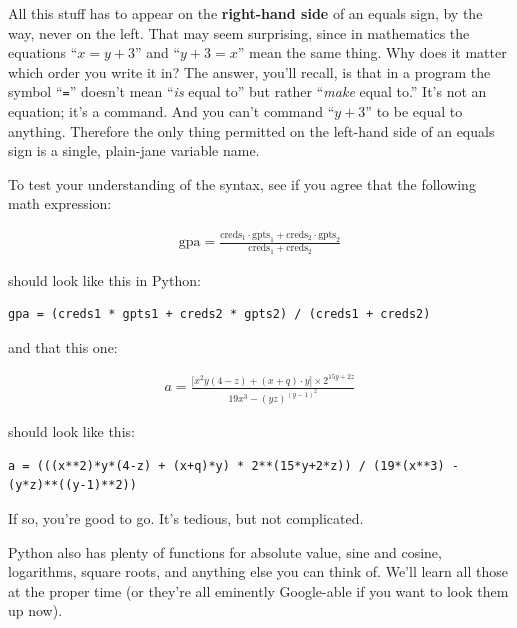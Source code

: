 All this stuff has to appear on the \textbf{right-hand side} of an equals sign,
by the way, never on the left. That may seem surprising, since in mathematics
the equations ``$x = y + 3$'' and ``$y + 3 = x$'' mean the same thing. Why does
it matter which order you write it in? The answer, you'll recall, is that in a
program the symbol ``\texttt{=}'' doesn't mean ``\textit{is} equal to'' but
rather ``\textit{make} equal to.'' It's not an equation; it's a command. And
you can't command ``$y+3$'' to be equal to anything. Therefore the only thing
permitted on the left-hand side of an equals sign is a single, plain-jane
variable name.

To test your understanding of the syntax, see if you agree that the following
math expression:

\begin{align*}
\textrm{gpa} = \frac{
\textrm{creds}_1 \cdot \textrm{gpts}_1 +
\textrm{creds}_2 \cdot \textrm{gpts}_2}
{\textrm{creds}_1 + \textrm{creds}_2}
\end{align*}

should look like this in Python:

\begin{Verbatim}[fontsize=\footnotesize,samepage=true,frame=single,framesep=3mm]
gpa = (creds1 * gpts1 + creds2 * gpts2) / (creds1 + creds2)
\end{Verbatim}

and that this one:

\begin{align*}
a = \frac{\lbrack x^2y(4-z) + (x+q)\cdot y \rbrack \times 2^{15y+2z}}
{19x^3 - (yz)^{(y-1)^2}}
\end{align*}

should look like this:

\begin{Verbatim}[fontsize=\tiny,samepage=true,frame=single,framesep=3mm]
a = (((x**2)*y*(4-z) + (x+q)*y) * 2**(15*y+2*z)) / (19*(x**3) - (y*z)**((y-1)**2))
\end{Verbatim}

\vspace{-.15in}

If so, you're good to go. It's tedious, but not complicated.

Python also has plenty of functions for absolute value, sine and cosine,
logarithms, square roots, and anything else you can think of. We'll learn all
those at the proper time (or they're all eminently Google-able if you want to
look them up now).


